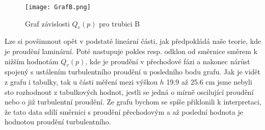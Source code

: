 \documentclass[a4paper]{article}
\begin{document}
\begin{figure}[H]
\centering
\texttt{[image: GrafB.png]}
\caption{Graf závislosti $Q_{v}(p)$ pro trubici B}
\end{figure}
\par Lze si povšimnout opět v podstatě lineární části, jak předpokládá naše teorie, kde je proudění laminární. Poté nastupuje pokles resp. odklon od směrnice směrem k nižším hodnotám $Q_{v}(p)$, kde je proudění v přechodové fázi a nakonec nárůst spojený s ustálením turbulentního proudění u posledního bodu grafu. Jak je vidět z grafu i tabulky, tak u části měření mezi výškou $h$ 19.9 až 25.6 cm jsme nebyli sto rozhodnout z tabulkových hodnot, jestli se jedná o mírně oscilující proudění nebo o již turbulentní proudění. Ze grafu bychom se spíše přiklonili k interpretaci, že tato data sdílí směrnici s proudění přechodovým a až poslední hodnota je hodnotou proudění turbulentního.
\end{document}
